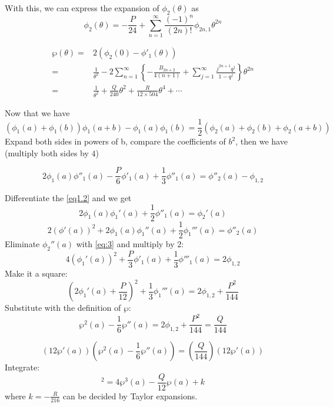 \documentclass{article}
\begin{document}
With this, we can express the expansion of $\phi_2(\theta)$ as
\begin{equation}
\phi_2(\theta)= -\frac{P}{24} + \sum\limits_{n=1}^{\infty} \frac{(-1)^n}{(2n)!}\phi_{2n,1}\theta^{2n}
\end{equation}

\begin{align*}
 \wp(\theta) =& 2(\phi_2(0) - \phi'_1(\theta))\\
 =& \frac{1}{\theta^2} - 2 \sum\limits_{n=1}^{\infty} \left\{ -\frac{B_{2n+2}}{4(n+1)} + \sum\limits_{j=1}^{\infty} \frac{j^{2n+1}q^j}{1-q^{j}} \right\}\theta^{2n} \\
 =& \frac{1}{\theta^2} + \frac{Q}{240}\theta^{2} + \frac{R}{12\times 504}\theta^4 + \cdots
\end{align*}

Now that we have \[(\phi_1(a)+ \phi_1(b))\phi_1(a+b)-\phi_1(a)\phi_1(b) = \frac{1}{2} \left( \phi_2(a)+\phi_2(b)+\phi_2(a+b) \right)\]
Expand both sides in powers of b, compare the coefficients of $b^2$, then we have (multiply both sides by $4$)

\begin{equation}
\label{eq:3}
2\phi_1(a)\phi''_1(a) - \frac{P}{6}\phi'_1(a) + \frac{1}{3}\phi''_1(a) = \phi''_2(a) - \phi_{1,2}
\end{equation}

Differentiate the \ref{eq1.2} and we get
\begin{equation}
2\phi_1(a)\phi_1'(a) + \frac{1}{2} \phi''_1(a) = \phi_2'(a)
\end{equation}
\begin{equation}
2(\phi'(a))^2 + 2\phi_1(a) \phi_1''(a) + \frac{1}{2}\phi_1'''(a) = \phi''_2(a)
\end{equation}
Eliminate $\phi_2''(a)$ with \ref{eq:3} and multiply by $2$:
\begin{equation}
4(\phi_1'(a))^2 + \frac{P}{3} \phi'_1(a) + \frac{1}{3} \phi'''_1(a) = 2 \phi_{1,2}
\end{equation}
Make it a square:
\begin{equation}
\left( 2\phi_1'(a) + \frac{P}{12} \right)^2 + \frac{1}{3}\phi_1'''(a) = 2\phi_{1,2} + \frac{P^2}{144}
\end{equation}
Substitute with the definition of $\wp$:
\begin{equation}
\wp^2(a) - \frac{1}{6}\wp''(a) = 2\phi_{1,2} + \frac{P^2}{144} = \frac{Q}{144}
\end{equation}


\begin{equation*}
(12\wp'(a))(\wp^2(a) - \frac{1}{6}\wp''(a) ) = (\frac{Q}{144})(12\wp'(a))
\end{equation*}
Integrate:
\begin{equation*}
[\wp'(a)]^2 = 4\wp^3(a) - \frac{Q}{12}\wp(a) + k
\end{equation*}
where $k= -\frac{R}{216}$ can be decided by Taylor expansions.
\end{document}
